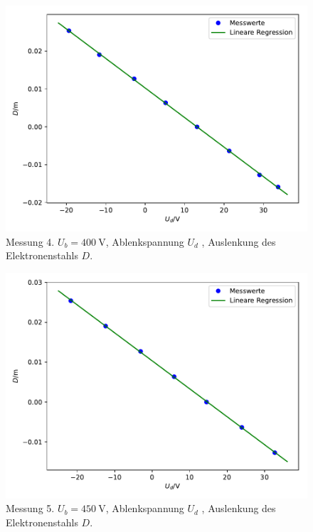 \begin{figure}
  \centering
  \includegraphics[scale=0.7]{Plot1.4.pdf}
  \caption{Messung 4. $U_b = \SI{400}{\volt}$, Ablenkspannung $U_d$ , Auslenkung des Elektronenstahls $D$.}
  \label{abb:4}
\end{figure}

\begin{figure}
  \centering
  \includegraphics[scale=0.7]{Plot1.5.pdf}
  \caption{Messung 5. $U_b = \SI{450}{\volt}$, Ablenkspannung $U_d$ , Auslenkung des Elektronenstahls $D$.}
  \label{abb:5}
\end{figure}


